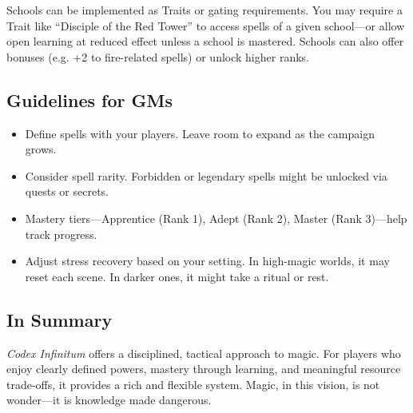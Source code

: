 Schools can be implemented as Traits or gating requirements. You may require a Trait like “Disciple of the Red Tower” to access spells of a given school—or allow open learning at reduced effect unless a school is mastered. Schools can also offer bonuses (e.g. +2 to fire-related spells) or unlock higher ranks.

\subsection{Guidelines for GMs}

\begin{itemize}
    \item Define spells with your players. Leave room to expand as the campaign grows.
    \item Consider spell rarity. Forbidden or legendary spells might be unlocked via quests or secrets.
    \item Mastery tiers—Apprentice (Rank 1), Adept (Rank 2), Master (Rank 3)—help track progress.
    \item Adjust stress recovery based on your setting. In high-magic worlds, it may reset each scene. In darker ones, it might take a ritual or rest.
\end{itemize}

\subsection{In Summary}

\textit{Codex Infinitum} offers a disciplined, tactical approach to magic. For players who enjoy clearly defined powers, mastery through learning, and meaningful resource trade-offs, it provides a rich and flexible system. Magic, in this vision, is not wonder—it is knowledge made dangerous.
